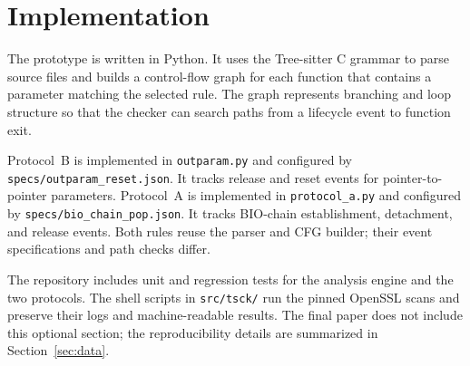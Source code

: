 \section{Implementation}
\label{sec:impl}

The prototype is written in Python. It uses the Tree-sitter C grammar to
parse source files and builds a control-flow graph for each function that
contains a parameter matching the selected rule. The graph represents
branching and loop structure so that the checker can search paths from a
lifecycle event to function exit.

Protocol~B is implemented in \texttt{outparam.py} and configured by
\texttt{specs/outparam\_reset.json}. It tracks release and reset events
for pointer-to-pointer parameters. Protocol~A is implemented in
\texttt{protocol\_a.py} and configured by
\texttt{specs/bio\_chain\_pop.json}. It tracks BIO-chain establishment,
detachment, and release events. Both rules reuse the parser and CFG
builder; their event specifications and path checks differ.

The repository includes unit and regression tests for the analysis
engine and the two protocols. The shell scripts in \texttt{src/tsck/}
run the pinned OpenSSL scans and preserve their logs and machine-readable
results. The final paper does not include this optional section; the
reproducibility details are summarized in Section~\ref{sec:data}.
